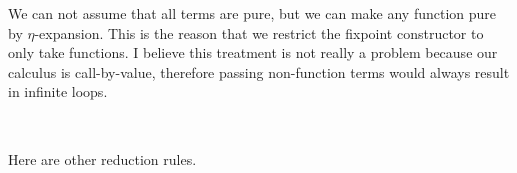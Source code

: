 \documentclass[a4paper,11pt]{article}
\begin{document}
\begin{AgdaAlign}
We can not assume that all terms are pure, but we can make any function pure by $\eta$-expansion.
This is the reason that we restrict the fixpoint constructor to only take functions.
I believe this treatment is not really a problem because our calculus is call-by-value, therefore passing non-function terms would always result in infinite loops.
\begin{code}%
%
\>[4]\AgdaSpace{}%
\AgdaSymbol{:}\AgdaSpace{}%
\AgdaSymbol{\{}\AgdaSpace{}%
\AgdaSymbol{:}\AgdaSpace{}%
\AgdaSpace{}%
\AgdaSymbol{(}\AgdaSpace{}%
\AgdaOperator{\AgdaInductiveConstructor{,}}\AgdaSpace{}%
\AgdaSpace{}%
\AgdaSpace{}%
\AgdaSpace{}%
\AgdaOperator{\AgdaInductiveConstructor{!}}\AgdaSpace{}%
\AgdaSymbol{)}\AgdaSpace{}%
\AgdaSpace{}%
\AgdaSymbol{(}\AgdaSpace{}%
\AgdaSpace{}%
\AgdaSpace{}%
\AgdaOperator{\AgdaInductiveConstructor{!}}\AgdaSpace{}%
\AgdaSymbol{)\}}\<%
\\
\>[4][@{}l@{\AgdaIndent{0}}]%
\>[6]\AgdaSpace{}%
\AgdaSpace{}%
\AgdaSpace{}%
\AgdaSpace{}%
\AgdaSpace{}%
\AgdaOperator{\AgdaFunction{[}}\AgdaSpace{}%
\AgdaSpace{}%
\AgdaSymbol{(}\AgdaSpace{}%
\AgdaSymbol{(}\AgdaSpace{}%
\AgdaSymbol{))}\AgdaSpace{}%
\AgdaSpace{}%
\AgdaSpace{}%
\AgdaSpace{}%
\AgdaOperator{\AgdaFunction{]}}\<%
\end{code}
Here are other reduction rules.
\begin{code}%
%
\>[4]\AgdaSpace{}%
\AgdaSymbol{:}\AgdaSpace{}%
\AgdaSpace{}%
\AgdaSymbol{\{}\AgdaSpace{}%
\AgdaSymbol{:}\AgdaSpace{}%
\AgdaSpace{}%
\AgdaSymbol{(}\AgdaSpace{}%
\AgdaOperator{\AgdaInductiveConstructor{,}}\AgdaSpace{}%
\AgdaSymbol{)}\AgdaSpace{}%
\AgdaSpace{}%
\AgdaSymbol{\}}\AgdaSpace{}%
\AgdaSymbol{\{}\AgdaSymbol{\}}\<%
\\
\>[4][@{}l@{\AgdaIndent{0}}]%

\end{code}
\end{AgdaAlign}
\end{document}
